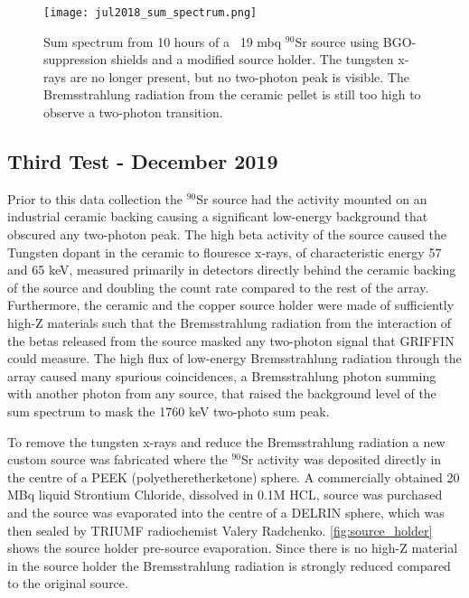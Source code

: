 \documentclass[cnatzke_thesis_proposal.tex]{subfiles}
\begin{document}
\begin{figure}[htbp]
  \centering
  \texttt{[image: jul2018\_sum\_spectrum.png]}
  \caption{Sum spectrum from 10 hours of a ~19 mbq $^{90}$Sr source using BGO-suppression shields and a modified source holder. The tungsten x-rays are no longer present, but no two-photon peak is visible. The Bremsstrahlung radiation from the ceramic pellet is still too high to observe a two-photon transition.}
  \label{fig:sum_spectrum_jul2018}
\end{figure}

\subsection{Third Test - December 2019}

Prior to this data collection the $^{90}$Sr source had the activity mounted on an industrial ceramic backing causing a significant low-energy background that obscured any two-photon peak.
The high beta activity of the source caused the Tungsten dopant in the ceramic to flouresce x-rays, of characteristic energy 57 and 65 keV, measured primarily in detectors directly behind the ceramic backing of the source and doubling the count rate compared to the rest of the array. 
Furthermore, the ceramic and the copper source holder were made of sufficiently high-Z materials such that the Bremsstrahlung radiation from the interaction of the betas released from the source masked any two-photon signal that GRIFFIN could measure.
The high flux of low-energy Bremsstrahlung radiation through the array caused many spurious coincidences, a Bremsstrahlung photon summing with another photon from any source, that raised the background level of the sum spectrum to mask the 1760 keV two-photo sum peak.

To remove the tungsten x-rays and reduce the Bremsstrahlung radiation a new custom source was fabricated where the $^{90}$Sr activity was deposited directly in the centre of a PEEK (polyetheretherketone) sphere.
A commercially obtained 20 MBq liquid Strontium Chloride, dissolved in 0.1M HCL, source was purchased and the source was evaporated into the centre of a DELRIN sphere, which was then sealed by TRIUMF radiochemist Valery Radchenko.
\ref{fig:source_holder} shows the source holder pre-source evaporation.
Since there is no high-Z material in the source holder the Bremsstrahlung radiation is strongly reduced compared to the original source.
\end{document}
